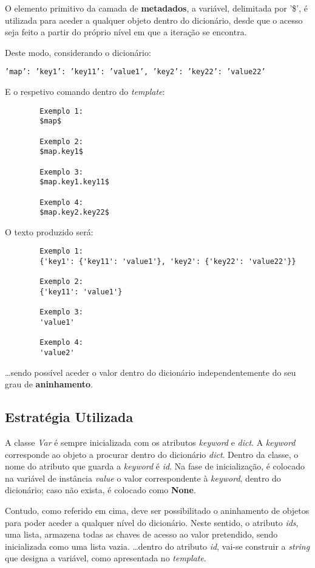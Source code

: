 \documentclass[../relatorio.tex]{subfiles}
\begin{document}
    O elemento primitivo da camada de \textbf{metadados},
    a variável, delimitada por '\$', é utilizada para 
    aceder a qualquer objeto dentro do dicionário,
    desde que o acesso seja feito a partir do próprio nível em que a 
    iteração se encontra.

    Deste modo, considerando o dicionário:
    
    \texttt{'map': {'key1': {'key11': 'value1'}, 'key2': {'key22': 'value22'}}}

    E o respetivo comando dentro do \textit{template}:
    \begin{verbatim}
        Exemplo 1:
        $map$

        Exemplo 2:
        $map.key1$

        Exemplo 3:
        $map.key1.key11$

        Exemplo 4:
        $map.key2.key22$
    \end{verbatim}

    O texto produzido será: 

    \begin{verbatim}
        Exemplo 1:
        {'key1': {'key11': 'value1'}, 'key2': {'key22': 'value22'}}

        Exemplo 2:
        {'key11': 'value1'}

        Exemplo 3:
        'value1'

        Exemplo 4:
        'value2'
    \end{verbatim}

    \dots sendo possível aceder o valor dentro do dicionário
    independentemente do seu grau de \textbf{aninhamento}.

    \subsection*{Estratégia Utilizada}
    A classe \textit{Var} é sempre inicializada com os atributos \textit{keyword} e
    \textit{dict}.
    A \textit{keyword} corresponde ao objeto a procurar dentro do dicionário \textit{dict}.
    Dentro da classe, o nome do atributo que guarda a \textit{keyword} é \textit{id}.
    Na fase de inicialização, é colocado na variável de instância \textit{value} o valor correspondente 
    à \textit{keyword}, dentro do dicionário; caso não exista, é colocado como \textbf{None}.

    Contudo, como referido em cima, deve ser possibilitado o aninhamento de objetos para poder 
    aceder a qualquer nível do dicionário.
    Neste sentido, o atributo \textit{ids}, uma lista, armazena todas 
    as chaves de acesso ao valor pretendido, sendo inicializada como uma lista vazia.
    \dots dentro do atributo \textit{id}, vai-se construir a \textit{string} que designa a variável,
    como apresentada no \textit{template}.
\end{document}
